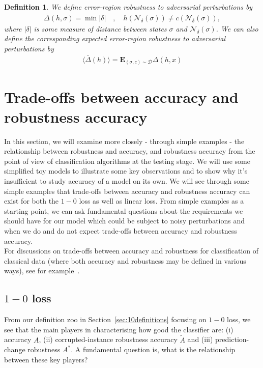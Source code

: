 \documentclass[onecolumn,prx, superscriptaddress,longbibliography,margin=1mm 11pt]{revtex4-2}
\newtheorem{definition}[theorem]{Definition}
\begin{document}
\begin{definition}
We define \textit{error-region robustness to adversarial perturbations} by 
\begin{align}
    \bar{\Delta}(h,\sigma)=\min {|\delta|} \quad, \quad h(\mathcal{N}_{\delta}(\sigma))\neq c(\mathcal{N}_{\delta}(\sigma)),
\end{align}
where $|\delta|$ is some measure of distance between states $\sigma$ and $\mathcal{N}_{\delta}(\sigma)$.
We can also define the corresponding \textit{expected error-region robustness to adversarial perturbations} by
\begin{align}
    \langle \bar{\Delta}(h) \rangle= \textbf{E}_{{(\sigma, c) \sim \mathcal{D}}} \Delta(h,x) 
\end{align}
\end{definition}

\section{Trade-offs between accuracy and robustness accuracy}
In this section, we will examine more closely - through simple examples - the relationship between robustness and accuracy, and robustness accuracy from the point of view of classification algorithms at the testing stage. We will use some simplified toy models to illustrate some key observations and to show why it's insufficient to study accuracy of a model on its own. We will see through some simple examples that trade-offs between accuracy and robustness accuracy can exist for both the $1-0$ loss as well as linear loss. From simple examples as a starting point, we can ask fundamental questions about the requirements we should have for our model which could be subject to noisy perturbations and when we do and do not expect trade-offs between accuracy and robustness accuracy. \\

For discussions on trade-offs between accuracy and robustness for classification of classical data (where both accuracy and robustness may be defined in various ways), see for example~\cite{dobriban2023provable, tsipras2018robustness, xu2012robustness, yang2020closer, zhang2019theoretically}.

\subsection{$1-0$ loss}
From our definition zoo in Section~\ref{sec:10definitions} focusing on $1-0$ loss, we see that the main players in characterising how good the classifier are: (i) accuracy $A$, (ii) corrupted-instance robustness accuracy $\tilde{A}$ and (iii) prediction-change robustness $A^*$. A fundamental question is, what is the relationship between these key players? \\
\end{document}
